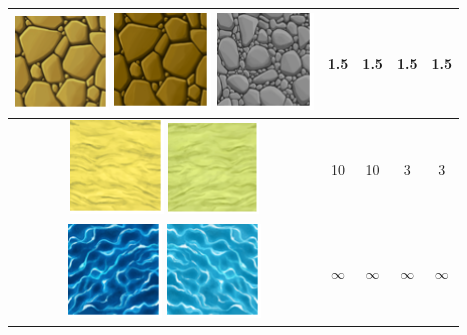 \begin{table}[H]
\begin{tabular}{|c|c|c|c|c|}
        \includegraphics{imagesTable/claroPiedra} \includegraphics{imagesTable/piedra} \includegraphics{imagesTable/grisPiedra} & 1.5 & 1.5 & 1.5 & 1.5 \\
        \hline
        \includegraphics{imagesTable/arena} \includegraphics{imagesTable/claroArena} & 10 & 10 & 3 & 3 \\
        \hline
        \includegraphics{imagesTable/agua} \includegraphics{imagesTable/claroAgua} & $\infty$ & $\infty$  & $\infty$ & $\infty$ \\

\end{tabular}
\end{table}
